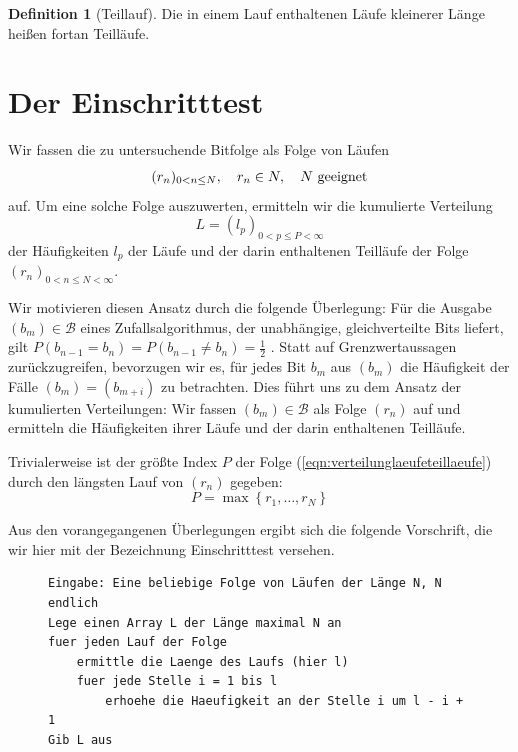 \documentclass[11pt,a4paper]{scrartcl}
\theoremstyle{plain}
\theoremstyle{definition}
\newtheorem{defi}[satz]{Definition}
\theoremstyle{remark}
\begin{document}
\begin{defi}[Teillauf]\label{defi:teillauf}
Die in einem Lauf enthaltenen Läufe kleinerer Länge heißen fortan
Teilläufe.
\end{defi}

\section{Der Einschritttest}\label{sec:einschritttest}

Wir fassen die zu untersuchende Bitfolge als Folge von Läufen
\begin{equation}\label{eqn:laeuflangefolge}
  (r_n)_{0<n\leq N},\quad r_n\in\mathcal \mathbb N,\quad N\text{ geeignet}
\end{equation}
auf. Um eine solche Folge auszuwerten, ermitteln wir die kumulierte
Verteilung
\begin{equation}\label{eqn:verteilunglaeufeteillaeufe}
  L=(l_p)_{0<p\leq P<\infty}
\end{equation}
der Häufigkeiten $l_p$ der Läufe und der darin enthaltenen Teilläufe der
Folge $(r_n)_{0<n\leq N<\infty}$.

Wir motivieren diesen Ansatz durch die folgende Überlegung: Für die
Ausgabe $(b_m)\in \mathcal B$ eines Zufallsalgorithmus, der unabhängige,
gleichverteilte Bits liefert, gilt
$P(b_{n-1}=b_n)=P(b_{n-1}\neq b_n)=\tfrac{1}{2}$ \cite{feller1968}.
Statt auf Grenzwertaussagen zurückzugreifen, bevorzugen wir es, für
jedes Bit $b_m$ aus $(b_m)$ die Häufigkeit der Fälle
$(b_{m})=(b_{m+i})$ zu betrachten. Dies führt uns zu dem Ansatz der
kumulierten Verteilungen: Wir fassen $(b_m)\in\mathcal B$ als Folge
$(r_n)$ auf und ermitteln die Häufigkeiten ihrer Läufe und
der darin enthaltenen Teilläufe.

Trivialerweise ist der größte Index $P$ der Folge
(\ref{eqn:verteilunglaeufeteillaeufe}) durch den längsten Lauf von
$(r_n)$ gegeben:
\begin{equation}\label{eqn:maximalelaengevonl}
  P=\max\left\{ r_1,\dots, r_N\right\}
\end{equation}

\noindent Aus den vorangegangenen Überlegungen ergibt sich die folgende
Vorschrift, die wir hier mit der Bezeichnung Einschritttest versehen.

\begin{figure}[htbp]
\begin{lstlisting}[caption={Einschritttest für Folgen von Läufen},label={algo:einschritt-laeufe}]
Eingabe: Eine beliebige Folge von Läufen der Länge N, N endlich
Lege einen Array L der Länge maximal N an
fuer jeden Lauf der Folge
    ermittle die Laenge des Laufs (hier l)
    fuer jede Stelle i = 1 bis l
        erhoehe die Haeufigkeit an der Stelle i um l - i + 1
Gib L aus
\end{lstlisting}
\end{figure}
\end{document}
